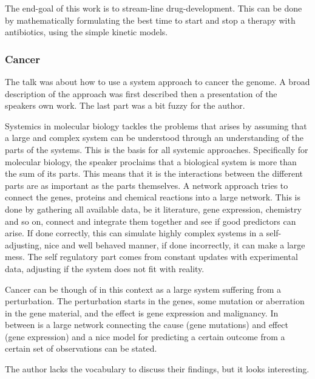 \documentclass[12p]{article}
\begin{document}
The end-goal of this work is to stream-line drug-development.
This can be done by mathematically formulating the best time to start and stop a therapy with antibiotics, using the simple kinetic models.


\subsubsection*{Cancer}

The talk was about how to use a system approach to cancer the genome.
A broad description of the approach was first described then a presentation of the speakers own work.
The last part was a bit fuzzy for the author.

Systemics in molecular biology tackles the problems that arises by assuming that a large and complex system can be understood through an understanding of the parts of the systems.
This is the basis for all systemic approaches.
Specifically for molecular biology, the speaker proclaims that a biological system is more than the sum of its parts.
This means that it is the interactions between the different parts are as important as the parts themselves.
A network approach tries to connect the genes, proteins and chemical reactions into a large network.
This is done by gathering all available data, be it literature, gene expression, chemistry and so on, connect and integrate them together and see if good predictors can arise.
If done correctly, this can simulate highly complex systems in a self-adjusting, nice and well behaved manner, if done incorrectly, it can make a large mess.
The self regulatory part comes from constant updates with experimental data, adjusting if the system does not fit with reality.

Cancer can be though of in this context as a large system suffering from a perturbation.
The perturbation starts in the genes, some mutation or aberration in the gene material, and the effect is gene expression and malignancy.
In between is a large network connecting the cause (gene mutations) and effect (gene expression) and a nice model for predicting a certain outcome from a certain set of observations can be stated.

The author lacks the vocabulary to discuss their findings, but it looks interesting.






%
%
%
%
%
\end{document}

